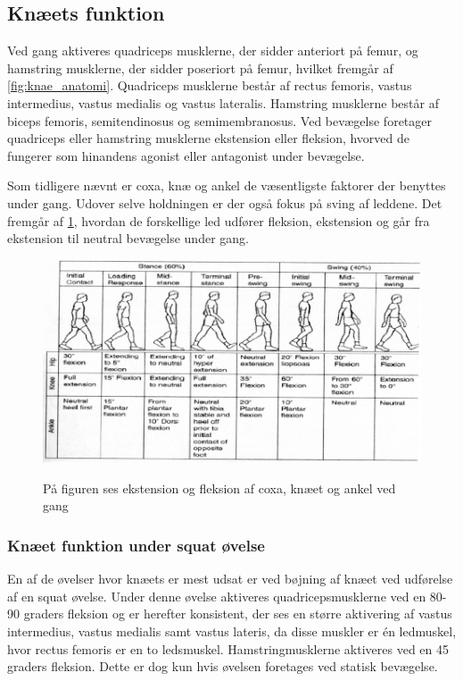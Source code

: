 \subsection{Knæets funktion}
Ved gang aktiveres quadriceps musklerne, der sidder anteriort på femur, og hamstring musklerne, der sidder poseriort på femur, hvilket fremgår af \ref{fig:knae_anatomi}. Quadriceps musklerne består af rectus femoris, vastus intermedius, vastus medialis og vastus lateralis. Hamstring musklerne består af biceps femoris, semitendinosus og semimembranosus. Ved bevægelse foretager quadriceps eller hamstring musklerne ekstension eller fleksion, hvorved de fungerer som hinandens agonist eller antagonist under bevægelse. 

Som tidligere nævnt er coxa, knæ og ankel de væsentligste faktorer der benyttes under gang. Udover selve holdningen er der også fokus på sving af leddene. Det fremgår af \ref{fig:knaet}, hvordan de forskellige led udfører fleksion, ekstension og går fra ekstension til neutral bevægelse under gang. 

\begin{figure}
\centering
\includegraphics[width=1\textwidth]{figures/knaet}
\label{fig:knaet}
\caption{På figuren ses ekstension og fleksion af coxa, knæet og ankel ved gang}
\end{figure} 

\subsubsection{Knæet funktion under squat øvelse}
En af de øvelser hvor knæets er mest udsat er ved bøjning af knæet ved udførelse af en squat øvelse. Under denne øvelse aktiveres quadricepsmusklerne ved en 80-90 graders fleksion og er herefter konsistent, der ses en større aktivering af vastus intermedius, vastus medialis samt vastus lateris, da disse muskler er én ledmuskel, hvor rectus femoris er en to ledsmuskel. Hamstringmusklerne aktiveres ved en 45 graders fleksion. Dette er dog kun hvis øvelsen foretages ved statisk bevægelse.





